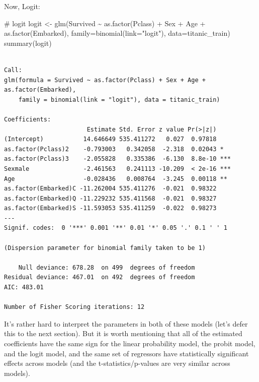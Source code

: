 \documentclass[
  letterpaper,
  DIV=11,
  numbers=noendperiod]{scrreprt}
\newenvironment{Shaded}{\begin{snugshade}}{\end{snugshade}}
\newcommand{\AttributeTok}[1]{\textcolor[rgb]{0.40,0.45,0.13}{#1}}
\newcommand{\CommentTok}[1]{\textcolor[rgb]{0.37,0.37,0.37}{#1}}
\newcommand{\FunctionTok}[1]{\textcolor[rgb]{0.28,0.35,0.67}{#1}}
\newcommand{\NormalTok}[1]{\textcolor[rgb]{0.00,0.23,0.31}{#1}}
\newcommand{\OtherTok}[1]{\textcolor[rgb]{0.00,0.23,0.31}{#1}}
\newcommand{\SpecialCharTok}[1]{\textcolor[rgb]{0.37,0.37,0.37}{#1}}
\newcommand{\StringTok}[1]{\textcolor[rgb]{0.13,0.47,0.30}{#1}}
\begin{document}
Now, Logit:

\begin{Shaded}
\begin{Highlighting}[]
\CommentTok{\# logit}
\NormalTok{logit }\OtherTok{\textless{}{-}} \FunctionTok{glm}\NormalTok{(Survived }\SpecialCharTok{\textasciitilde{}} \FunctionTok{as.factor}\NormalTok{(Pclass) }\SpecialCharTok{+}\NormalTok{ Sex }\SpecialCharTok{+}\NormalTok{ Age }\SpecialCharTok{+} \FunctionTok{as.factor}\NormalTok{(Embarked), }
              \AttributeTok{family=}\FunctionTok{binomial}\NormalTok{(}\AttributeTok{link=}\StringTok{"logit"}\NormalTok{), }
              \AttributeTok{data=}\NormalTok{titanic\_train)}
\FunctionTok{summary}\NormalTok{(logit)}
\end{Highlighting}
\end{Shaded}

\begin{verbatim}

Call:
glm(formula = Survived ~ as.factor(Pclass) + Sex + Age + as.factor(Embarked), 
    family = binomial(link = "logit"), data = titanic_train)

Coefficients:
                       Estimate Std. Error z value Pr(>|z|)    
(Intercept)           14.646649 535.411272   0.027  0.97818    
as.factor(Pclass)2    -0.793003   0.342058  -2.318  0.02043 *  
as.factor(Pclass)3    -2.055828   0.335386  -6.130  8.8e-10 ***
Sexmale               -2.461563   0.241113 -10.209  < 2e-16 ***
Age                   -0.028436   0.008764  -3.245  0.00118 ** 
as.factor(Embarked)C -11.262004 535.411276  -0.021  0.98322    
as.factor(Embarked)Q -11.229232 535.411568  -0.021  0.98327    
as.factor(Embarked)S -11.593053 535.411259  -0.022  0.98273    
---
Signif. codes:  0 '***' 0.001 '**' 0.01 '*' 0.05 '.' 0.1 ' ' 1

(Dispersion parameter for binomial family taken to be 1)

    Null deviance: 678.28  on 499  degrees of freedom
Residual deviance: 467.01  on 492  degrees of freedom
AIC: 483.01

Number of Fisher Scoring iterations: 12
\end{verbatim}

It's rather hard to interpret the parameters in both of these models
(let's defer this to the next section). But it is worth mentioning that
all of the estimated coefficients have the same sign for the linear
probability model, the probit model, and the logit model, and the same
set of regressors have statistically significant effects across models
(and the t-statistics/p-values are very similar across models).
\end{document}
